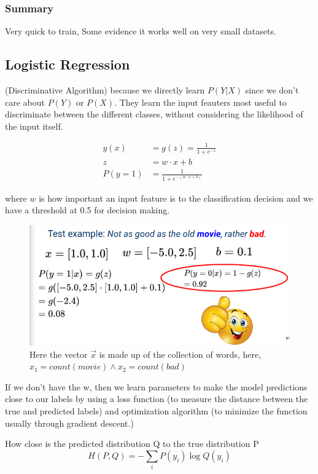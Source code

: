 \documentclass[11pt]{article}
\begin{document}
\subsubsection{Summary}

Very quick to train, Some evidence it works well on very small datasets.

\subsection{Logistic Regression}

(Discriminative Algorithm) because we directly learn $P(Y|X)$ since we don't care about $P(Y)$ or $P(X)$. They learn the input feauters most useful to discriminate between the different classes, without considering the likelihood of the input itself.

\begin{align*}
    y(x) & = g(z) = \frac 1 {1 + e^{-z}} \\
    z & = w \cdot x + b \\
    P(y=1) & = \frac{1 } {1 + e^{- (w \cdot x + b)}}
\end{align*}

where $w$ is how important an input feature is to the classification decision and we have a threshold at 0.5 for decision making.

\begin{figure}[H]
    \centering
    \includegraphics[trim={0.7cm 0 0 0}, clip, width=.6\linewidth]{figures/example2.png}
    \caption{Here the vector $\vec{x}$ is made up of the collection of words, here, $x_1=count(movie) \wedge x_2=count(bad)$}
\end{figure}

If we don't have the w, then we learn parameters to make the model predictions close to our labels by using a loss function (to measure the distance between the true and predicted labels) and optimization algorithm (to minimize the function usually through gradient descent.)

\begin{definition}\label{eq:logistic-regression}
    How close is the predicted distribution Q to the true distribution P
    \begin{equation*}
        H(P,Q) = -\sum_i P(y_i)\log Q(y_i)
    \end{equation*}
\end{definition}
\end{document}
